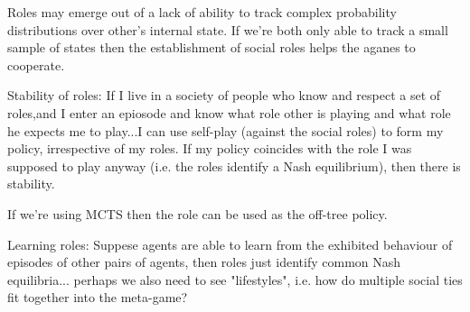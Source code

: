 \documentclass[a4paper]{article}
\begin{document}
Roles may emerge out of a lack of ability to track complex probability distributions over other's internal state. If we're both only able to track a small sample of states then the establishment of social roles helps the aganes to cooperate.


Stability of roles: If I live in a society of people who know and respect a set of roles,and I enter an epiosode and know what role other is playing and what role he expects me to play...I can use self-play (against the social roles) to form my policy, irrespective of my roles. If my policy coincides with the role I was supposed to play anyway (i.e. the roles identify a Nash equilibrium), then there is stability.

If we're using MCTS then the role can be used as the off-tree policy.

Learning roles: Suppese agents are able to learn from the exhibited behaviour of episodes of other pairs of agents, then roles just identify common Nash equilibria... perhaps we also need to see "lifestyles", i.e. how do multiple social ties fit together into the meta-game?
 

\end{document}
